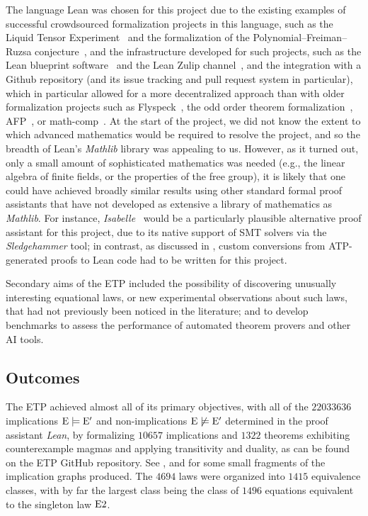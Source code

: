 The language Lean was chosen for this project due to the existing examples of successful crowdsourced formalization projects in this language, such as the Liquid Tensor Experiment~\cite{LTE_Scholze_2022, lean_liquid} and the formalization of the Polynomial--Freiman--Ruzsa conjecture~\cite{PFR_Tao_Dilles_2023}, and the infrastructure developed for such projects, such as the Lean blueprint software~\cite{leanblueprint} and the Lean Zulip channel~\cite{zulip_lean}, and the integration with a Github repository (and its issue tracking and pull request system in particular), which in particular allowed for a more decentralized approach than with older formalization projects such as Flyspeck~\cite{flyspeck}, the odd order theorem formalization~\cite{odd_order}, AFP~\cite{afp}, or math-comp~\cite{mathcomp}.  At the start of the project, we did not know the extent to which advanced mathematics would be required to resolve the project, and so the breadth of Lean's \emph{Mathlib} library was appealing to us.  However, as it turned out, only a small amount of sophisticated mathematics was needed (e.g., the linear algebra of finite fields, or the properties of the free group), it is likely that one could have achieved broadly similar results using other standard formal proof assistants that have not developed as extensive a library of mathematics as \emph{Mathlib}. For instance, \emph{Isabelle}~\cite{isabelle_hol, sledgehammer_smt} would be a particularly plausible alternative proof assistant for this project, due to its native support of SMT solvers via the \emph{Sledgehammer} tool; in contrast, as discussed in , custom conversions from ATP-generated proofs to Lean code had to be written for this project.

Secondary aims of the ETP included the possibility of discovering unusually interesting equational laws, or new experimental observations about such laws, that had not previously been noticed in the literature; and to develop benchmarks to assess the performance of automated theorem provers and other AI tools.

\subsection{Outcomes}

The ETP achieved almost all of its primary objectives, with all of the $\num{22033636}$ implications ${\mathrm{E}} \models {\mathrm{E}'}$ and non-implications $\mathrm{E} \not \models {\mathrm{E}'}$ determined in the proof assistant \emph{Lean}, by formalizing $\num{10657}$ implications and $\num{1322}$ theorems exhibiting counterexample magmas and applying transitivity and duality, as can be found on the ETP GitHub repository.  See ,  and  for some small fragments of the implication graphs produced.
The $\num{4694}$ laws were organized into $\num{1415}$ equivalence classes, with by far the largest class being the class of $\num{1496}$ equations equivalent to the singleton law $\mathrm{E}2$.

